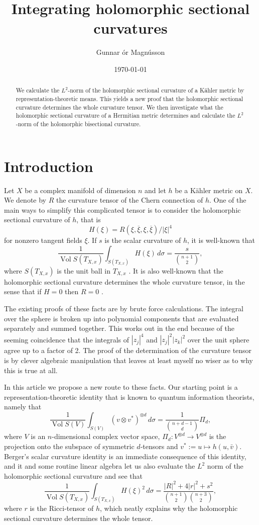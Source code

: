 \documentclass[10pt,a4paper]{amsart}
\author{Gunnar \TH\'or Magn\'usson}
\date{\today}
\title{Integrating holomorphic sectional curvatures}
\theoremstyle{definition}
\def\ov#1{\overline{#1}}
\def\d{\,d}
\DeclareMathOperator{\Vol}{Vol}
\begin{document}
\begin{abstract}
We calculate the $L^2$-norm of the holomorphic sectional curvature of a
K\"ahler metric by representation-theoretic means. This yields a new proof that
the holomorphic sectional curvature determines the whole curvature tensor.
We then investigate what the holomorphic sectional curvature of a Hermitian
metric determines and calculate the $L^2$-norm of the holomorphic bisectional
curvature.
\end{abstract}

\maketitle

\section*{Introduction}

Let $X$ be a complex manifold of dimension $n$ and let $h$ be a K\"ahler metric on $X$.
We denote by $R$ the curvature tensor of the Chern connection of $h$.
One of the main ways to simplify this complicated tensor is to consider the holomorphic sectional curvature of $h$, that is
$$
H(\xi) = R(\xi, \ov{\xi}, \xi, \ov{\xi}) / |\xi|^4
$$
for nonzero tangent fields $\xi$.
If $s$ is the scalar curvature of $h$, it is well-known that
$$
\frac{1}{\Vol S(T_{X,x})} \int_{S(T_{X,x})}
\!\!\!
H(\xi) \d\sigma
= \frac{s}{\binom{n+1}{2}},
$$
where $S(T_{X,x})$ is the unit ball in $T_{X,x}$
\cite{berger1965varietes}.
It is also well-known that the holomorphic sectional curvature determines the whole curvature tensor, in the sense that if $H = 0$ then $R = 0$
\cite{zheng2000complex}.

The existing proofs of these facts are by brute force calculations.
The integral over the sphere is broken up into polynomial components that are evaluated separately and summed together.
This works out in the end because of the seeming coincidence that the integrals of $|z_j|^4$ and $|z_j|^2 |z_k|^2$ over the unit sphere agree up to a factor of 2.
The proof of the determination of the curvature tensor is by clever algebraic manipulation that leaves at least myself no wiser as to why this is true at all.

In this article we propose a new route to these facts.
Our starting point is a representation-theoretic identity that is known to
quantum information theorists, namely that
$$
\frac{1}{\Vol S(V)} \int_{S(V)} (v \otimes v^*)^{\otimes d} \d\sigma
= \frac{1}{\binom{n+d-1}{d}} \Pi_{d},
$$
where $V$ is an $n$-dimensional complex vector space, $\Pi_{d} : V^{\otimes
d} \to V^{\otimes d}$ is the projection onto the subspace of symmetric
$d$-tensors and $v^* := u \mapsto h(u, \bar v)$.
Berger's scalar curvature identity is an immediate consequence of this
identity, and it and some routine linear algebra let us also evaluate the $L^2$
norm of the holomorphic sectional curvature and see that
$$
\frac{1}{\Vol S(T_{X,x})} \int_{S(T_{X,x})}
\!\!\!
H(\xi)^2 \d\sigma
= \frac{|R|^2 + 4|r|^2 + s^2}{\binom{n+1}{2}\binom{n+3}{2}},
$$
where $r$ is the Ricci-tensor of $h$, which neatly explains why the holomorphic
sectional curvature determines the whole tensor.
\end{document}
